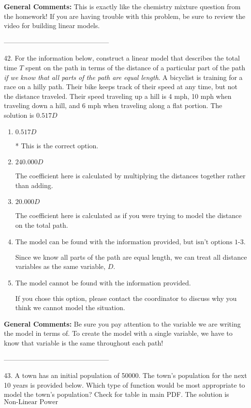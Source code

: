 \documentclass{extbook}[14pt]
\begin{document}
\textbf{General Comments:} This is exactly like the chemistry mixture question from the homework! If you are having trouble with this problem, be sure to review the video for building linear models.

-----------------------------------------------

42. For the information below, construct a linear model that describes the total time $T$ spent on the path in terms of the distance of a particular part of the path \textit{if we know that all parts of the path are equal length}.
A bicyclist is training for a race on a hilly path. Their bike keeps track of their speed at any time, but not the distance traveled. Their speed traveling up a hill is 4 mph, 10 mph when traveling down a hill, and 6 mph when traveling along a flat portion. 
The solution is $ 0.517 D $ 

\begin{enumerate}[label=\Alph*.] 
\item $ 0.517 D $ 

 * This is the correct option. 
\item $ 240.000 D $ 

 The coefficient here is calculated by multiplying the distances together rather than adding. 
\item $ 20.000 D $ 

 The coefficient here is calculated as if you were trying to model the distance on the total path. 
\item $ \text{The model can be found with the information provided, but isn't options 1-3.} $ 

 Since we know all parts of the path are equal length, we can treat all distance variables as the same variable, $D$. 
\item $ \text{The model cannot be found with the information provided.} $ 

 If you chose this option, please contact the coordinator to discuss why you think we cannot model the situation. 
\end{enumerate} 
 
\textbf{General Comments:} Be sure you pay attention to the variable we are writing the model in terms of. To create the model with a single variable, we have to know that variable is the same throughout each path!

-----------------------------------------------

43. A town has an initial population of 50000. The town's population for the next 10 years is provided below. Which type of function would be most appropriate to model the town's population?
Check for table in main PDF. 
The solution is $ \text{Non-Linear Power} $ 
\end{document}
